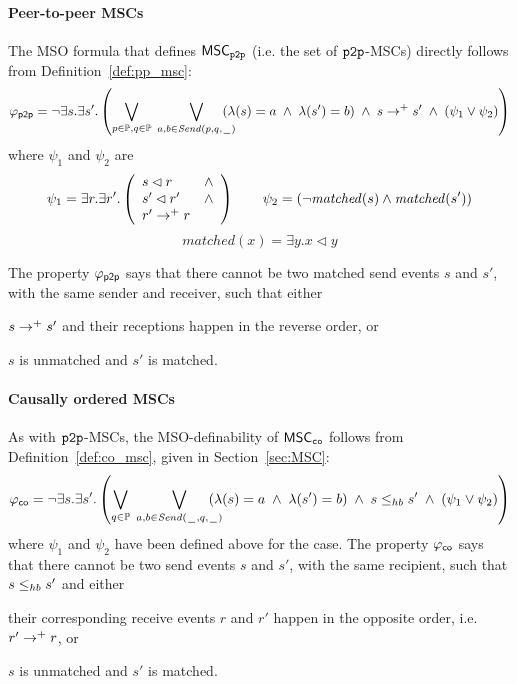 \paragraph{\bf Peer-to-peer MSCs}
The MSO formula that defines $\mathsf{MSC}_{\mathtt{p2p}}$ (i.e. the set of $\mathtt{p2p}$-MSCs) directly follows from Definition~\ref{def:pp_msc}:
\[
	\varphi_{\mathsf{p2p}} = \neg \exists s.\exists s'. \left(
	\bigvee_{\substack{p \in \mathbb{P}, q \in \mathbb{P}}}\;
	\bigvee_{\substack{a,b \in {\mathit{Send}(p,q,\hspace{0.1em}\underline{\hspace{0.5em}}\hspace{0.1em})}}}\hspace{-1em}
	(\lambda(s) = a \;\wedge\; \lambda(s') = b) \;\wedge\; s \to^+ s' \;\wedge\;
	(\psi_1 \vee \psi_2 )
	\right)
\]
where $\psi_1$ and $\psi_2$ are
\[
	\psi_1 = \exists r.\exists r'.\left(
	\begin{array}{ll}
		s \lhd r & \wedge\\
		s' \lhd r' & \wedge\\
		r' \to^+ r &
	\end{array}
	\right) \quad \quad
	\psi_2 = (\neg \mathit{matched}(s) \wedge \mathit{matched}(s'))
	\]
	\[
	matched(x) = \exists y. x \lhd y
\]

The property $\varphi_{\mathsf{p2p}}$ says that there cannot be two matched send events $s$ and $s'$, with the same sender and receiver, such that either
\begin{enumerate*}[label={(\roman*)}]
	\item $s \to^+ s'$ and their receptions happen in the reverse order, or
	\item $s$ is unmatched and $s'$ is matched.
\end{enumerate*}


\paragraph{\bf Causally ordered MSCs}
As with $\mathtt{p2p}$-MSCs, the MSO-definability of $\mathsf{MSC}_{\mathtt{co}}$ follows from Definition~\ref{def:co_msc}, given in Section~\ref{sec:MSC}:
\[
	\varphi_{\mathsf{co}} = \neg \exists s.\exists s'. \left(
	\bigvee_{\substack{q \in \mathbb{P}}}\;
	\bigvee_{\substack{a,b \in {\mathit{Send}(\hspace{0.1em}\underline{\hspace{0.5em}}\hspace{0.1em},q,\hspace{0.1em}\underline{\hspace{0.5em}}\hspace{0.1em})}}}\hspace{-1em}
	(\lambda(s) = a \;\wedge\; \lambda(s') = b) \;\wedge\; s \leq_{hb} s' \;\wedge\;
	(\psi_1 \vee \psi_2 )
	\right)
\]
where $\psi_1$ and $\psi_2$ have been defined above for the \pp case. The property $\varphi_{\mathsf{co}}$ says that there cannot be two send events $s$ and $s'$, with the same recipient, such that $s \leq_{hb} s'$ and either
\begin{enumerate*}[label={(\roman*)}]
	\item their corresponding receive events $r$ and $r'$ happen in the opposite order, i.e. $r' \to^+ r$, or
	\item $s$ is unmatched and $s'$ is matched.
\end{enumerate*}


